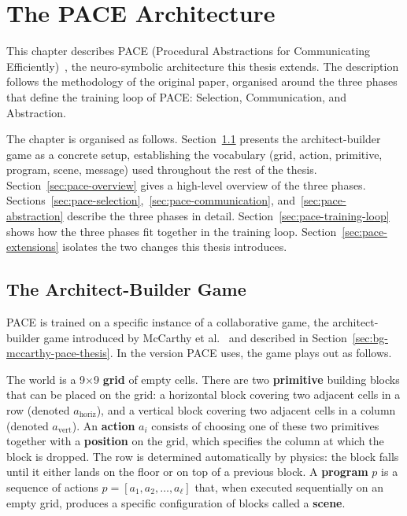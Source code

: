 \chapter{The PACE Architecture}
\label{ch:pace}

This chapter describes PACE (Procedural Abstractions for Communicating Efficiently)~\cite{thomas_pace_2025}, the neuro-symbolic architecture this thesis extends. The description follows the methodology of the original paper, organised around the three phases that define the training loop of PACE: Selection, Communication, and Abstraction.

The chapter is organised as follows. Section~\ref{sec:pace-setup} presents the architect-builder game as a concrete setup, establishing the vocabulary (grid, action, primitive, program, scene, message) used throughout the rest of the thesis. Section~\ref{sec:pace-overview} gives a high-level overview of the three phases. Sections~\ref{sec:pace-selection},~\ref{sec:pace-communication}, and~\ref{sec:pace-abstraction} describe the three phases in detail. Section~\ref{sec:pace-training-loop} shows how the three phases fit together in the training loop. Section~\ref{sec:pace-extensions} isolates the two changes this thesis introduces.

\section{The Architect-Builder Game}
\label{sec:pace-setup}

PACE is trained on a specific instance of a collaborative game, the architect-builder game introduced by McCarthy et al.~\cite{mccarthy_learning_2021} and described in Section~\ref{sec:bg-mccarthy-pace-thesis}. In the version PACE uses, the game plays out as follows.

The world is a 9$\times$9 \textbf{grid} of empty cells. There are two \textbf{primitive} building blocks that can be placed on the grid: a horizontal block covering two adjacent cells in a row (denoted $a_{\text{horiz}}$), and a vertical block covering two adjacent cells in a column (denoted $a_{\text{vert}}$). An \textbf{action} $a_i$ consists of choosing one of these two primitives together with a \textbf{position} on the grid, which specifies the column at which the block is dropped. The row is determined automatically by physics: the block falls until it either lands on the floor or on top of a previous block. A \textbf{program} $p$ is a sequence of actions $p = [a_1, a_2, \ldots, a_\ell]$ that, when executed sequentially on an empty grid, produces a specific configuration of blocks called a \textbf{scene}.

